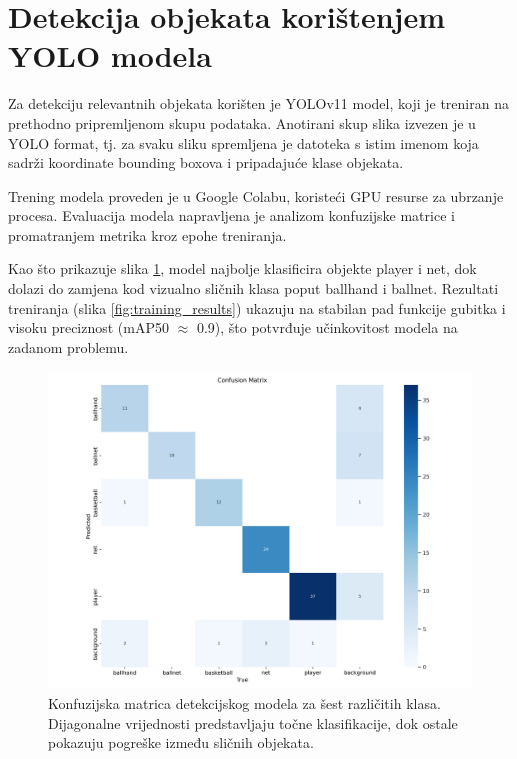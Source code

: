 \documentclass[zavrsnirad]{fer}
\begin{document}
\section{Detekcija objekata korištenjem YOLO modela}
\label{pog:detekcija_objekata_koristenjem_yolo_modela}
Za detekciju relevantnih objekata korišten je YOLOv11 model, koji je treniran na prethodno pripremljenom skupu podataka.
Anotirani skup slika izvezen je u YOLO format, tj. za svaku sliku spremljena je datoteka s istim imenom koja sadrži koordinate bounding boxova i pripadajuće klase objekata.

Trening modela proveden je u Google Colabu, koristeći GPU resurse za ubrzanje procesa.
Evaluacija modela napravljena je analizom konfuzijske matrice i promatranjem metrika kroz epohe treniranja. 

Kao što prikazuje slika \ref{fig:confusion_matrix}, model najbolje klasificira objekte player i net, dok dolazi do zamjena kod vizualno sličnih klasa poput ballhand i ballnet. 
Rezultati treniranja (slika \ref{fig:training_results}) ukazuju na stabilan pad funkcije gubitka i visoku preciznost (mAP50 $\approx$ 0.9), što potvrđuje učinkovitost modela na zadanom problemu.
\begin{figure}[H]
  \centering
  \includegraphics[width=\linewidth]{Figures/confusion_matrix.png}
  \caption{Konfuzijska matrica detekcijskog modela za šest različitih klasa. Dijagonalne vrijednosti predstavljaju točne klasifikacije, dok ostale pokazuju pogreške između sličnih objekata.}
  \label{fig:confusion_matrix}
\end{figure}
\end{document}
